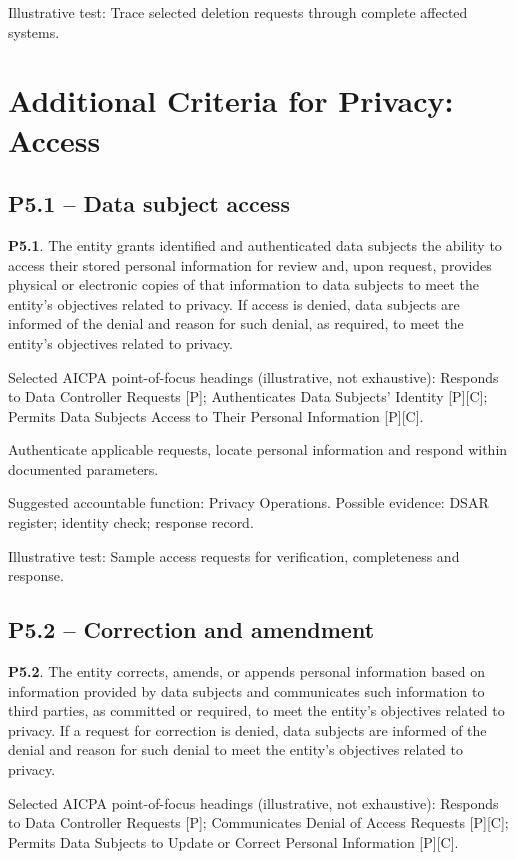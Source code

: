 \documentclass[10pt,oneside]{report}
\begin{document}
Illustrative test: Trace selected deletion requests through complete affected systems.

\section{Additional Criteria for Privacy: Access}
\subsection*{P5.1 -- Data subject access}
\begin{aicpabox}
\textbf{P5.1}. The entity grants identified and authenticated data subjects the ability to access their stored personal information for review and, upon request, provides physical or electronic copies of that information to data subjects to meet the entity's objectives related to privacy. If access is denied, data subjects are informed of the denial and reason for such denial, as required, to meet the entity's objectives related to privacy.\par{}
\end{aicpabox}
Selected AICPA point-of-focus headings (illustrative, not exhaustive): Responds to Data Controller Requests [P]; Authenticates Data Subjects' Identity [P][C]; Permits Data Subjects Access to Their Personal Information [P][C].

\begin{engineeringbox}
Authenticate applicable requests, locate personal information and respond within documented parameters.
\end{engineeringbox}
Suggested accountable function: Privacy Operations. Possible evidence: DSAR register; identity check; response record.

Illustrative test: Sample access requests for verification, completeness and response.

\subsection*{P5.2 -- Correction and amendment}
\begin{aicpabox}
\textbf{P5.2}. The entity corrects, amends, or appends personal information based on information provided by data subjects and communicates such information to third parties, as committed or required, to meet the entity's objectives related to privacy. If a request for correction is denied, data subjects are informed of the denial and reason for such denial to meet the entity's objectives related to privacy.\par{}
\end{aicpabox}
Selected AICPA point-of-focus headings (illustrative, not exhaustive): Responds to Data Controller Requests [P]; Communicates Denial of Access Requests [P][C]; Permits Data Subjects to Update or Correct Personal Information [P][C].
\end{document}
